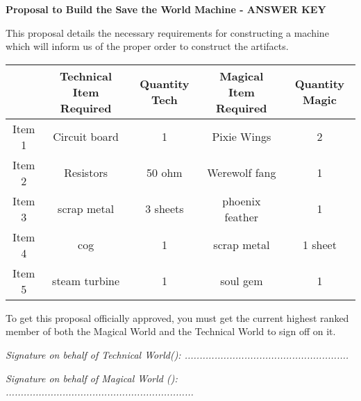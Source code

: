\documentclass[white]{guildcamp3}
\begin{document}
\name{\wProposalAns{}} %
\large\textbf{Proposal to Build the Save the World Machine - ANSWER KEY}  


This proposal details the necessary requirements for constructing a machine which will inform us of the proper order to construct the artifacts. 


\begin{tabular}{|c|c|c|c|c|}
	\hline \rule[-2ex]{0pt}{5.5ex}  & Technical Item Required & Quantity Tech & Magical Item Required & Quantity Magic \\ 
	\hline \rule[-2ex]{0pt}{5.5ex} Item 1 & Circuit board & 1 & Pixie Wings & 2 \\ 
	\hline \rule[-2ex]{0pt}{5.5ex} Item 2 & Resistors & 50 ohm & Werewolf fang & 1 \\ 
	\hline \rule[-2ex]{0pt}{5.5ex} Item 3 & scrap metal & 3 sheets & phoenix feather & 1 \\ 
	\hline \rule[-2ex]{0pt}{5.5ex} Item 4 & cog & 1 & scrap metal & 1 sheet \\ 
	\hline \rule[-2ex]{0pt}{5.5ex} Item 5 & steam turbine & 1 & soul gem & 1 \\ 
	\hline 
\end{tabular} 

To get this proposal officially approved, you must get the current highest ranked member of both the Magical World and the Technical World to sign off on it. 



\emph{Signature on behalf of Technical World(\cPoliOne{\intro}): .......................................................}

\emph{Signature on behalf of Magical World (\cNobleOne{\intro}): ...............................................................}


\end{document}
